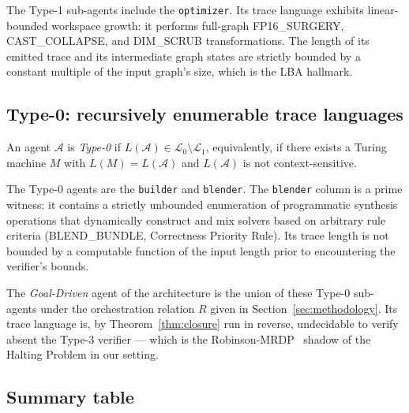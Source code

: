 The Type-1 sub-agents include the \texttt{optimizer}. Its trace
language exhibits linear-bounded workspace growth: it performs
full-graph \textsf{FP16\_SURGERY}, \textsf{CAST\_COLLAPSE}, and
\textsf{DIM\_SCRUB} transformations. The length of its emitted
trace and its intermediate graph states are strictly bounded by
a constant multiple of the input graph's size, which is the LBA
hallmark.

\subsection{Type-0: recursively enumerable trace languages}

\begin{definition}
\label{def:type0agent}
An agent $\mathcal{A}$ is \emph{Type-0} if $L(\mathcal{A}) \in
\mathcal{L}_0 \setminus \mathcal{L}_1$, equivalently, if there
exists a Turing machine $M$ with $L(M) = L(\mathcal{A})$ and
$L(\mathcal{A})$ is not context-sensitive.
\end{definition}

The Type-0 agents are the \texttt{builder} and \texttt{blender}.
The \texttt{blender} column is a prime witness: it contains a
strictly unbounded enumeration of programmatic synthesis operations
that dynamically construct and mix solvers based on arbitrary
rule criteria (\textsf{BLEND\_BUNDLE}, \textsf{Correctness Priority Rule}).
Its trace length is not bounded by a computable function of the
input length prior to encountering the verifier's bounds.

The \emph{Goal-Driven} agent of the architecture is the union of
these Type-0 sub-agents under the orchestration relation $R$ given
in Section~\ref{sec:methodology}.  Its trace language is, by
Theorem~\ref{thm:closure} run in reverse, undecidable to verify
absent the Type-3 verifier --- which is the
Robinson-MRDP~\cite{robinson1949definability,davis1961decision}
shadow of the Halting Problem in our setting.

\subsection{Summary table}

